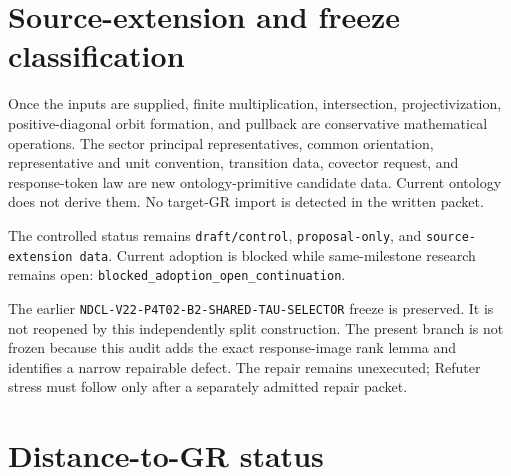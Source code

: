 \documentclass[11pt]{article}
\begin{document}
\section{Source-extension and freeze classification}

Once the inputs are supplied, finite multiplication, intersection,
projectivization, positive-diagonal orbit formation, and pullback are
conservative mathematical operations.  The sector principal representatives,
common orientation, representative and unit convention, transition data,
covector request, and response-token law are new ontology-primitive candidate
data.  Current ontology does not derive them.  No target-GR import is detected
in the written packet.

The controlled status remains \texttt{draft/control},
\texttt{proposal-only}, and \texttt{source-extension data}.  Current adoption
is blocked while same-milestone research remains open:
\texttt{blocked\_adoption\_open\_continuation}.

The earlier
\texttt{NDCL-V22-P4T02-B2-SHARED-TAU-SELECTOR} freeze is preserved.  It is not
reopened by this independently split construction.  The present branch is not
frozen because this audit adds the exact response-image rank lemma and identifies
a narrow repairable defect.  The repair remains unexecuted; Refuter stress must
follow only after a separately admitted repair packet.

\section{Distance-to-GR status}
\end{document}
